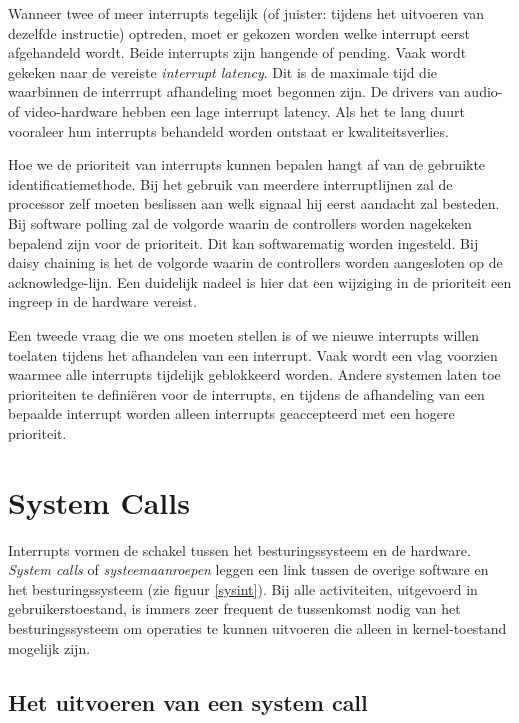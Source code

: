 Wanneer twee of meer interrupts tegelijk (of juister: tijdens
het uitvoeren van dezelfde instructie) optreden, moet er gekozen
worden welke interrupt eerst afgehandeld wordt. Beide interrupts zijn
hangende of pending. Vaak wordt gekeken naar de vereiste
\emph{interrupt latency}. Dit is de maximale tijd die
waarbinnen de interrrupt afhandeling moet begonnen zijn. De drivers
van audio- of video-hardware hebben een lage interrupt latency. Als
het te lang duurt vooraleer hun interrupts behandeld worden ontstaat
er kwaliteitsverlies.

Hoe we de prioriteit van interrupts kunnen bepalen hangt af van
de gebruikte identificatiemethode. Bij het gebruik van meerdere
interruptlijnen zal de processor zelf moeten beslissen aan welk
signaal hij eerst aandacht zal besteden. Bij software polling zal de
volgorde waarin de controllers worden nagekeken bepalend zijn voor de
prioriteit. Dit kan softwarematig worden ingesteld. Bij daisy chaining
is het de volgorde waarin de controllers worden aangesloten op de
acknowledge-lijn. Een duidelijk nadeel is hier dat een wijziging in de
prioriteit een ingreep in de hardware vereist.

Een tweede vraag die we ons moeten stellen is of we nieuwe
interrupts willen toelaten tijdens het afhandelen van een interrupt.
Vaak wordt een vlag voorzien waarmee alle interrupts tijdelijk
geblokkeerd worden. Andere systemen laten toe prioriteiten te
defini\"eren voor de interrupts, en tijdens de afhandeling van een
bepaalde interrupt worden alleen interrupts geaccepteerd met een
hogere prioriteit.

\section{System Calls}\label{systemcalls}

Interrupts vormen de schakel tussen het besturingssysteem en de
hardware. \emph{System calls} of
\emph{systeemaanroepen} leggen een link tussen de
overige software en het besturingssysteem (zie figuur \ref{sysint}). Bij alle
activiteiten, uitgevoerd in gebruikerstoestand, is immers zeer frequent de
tussenkomst nodig van het besturingssysteem om operaties te kunnen uitvoeren die
alleen in kernel-toestand mogelijk zijn.

\subsection{Het uitvoeren van een system call}


